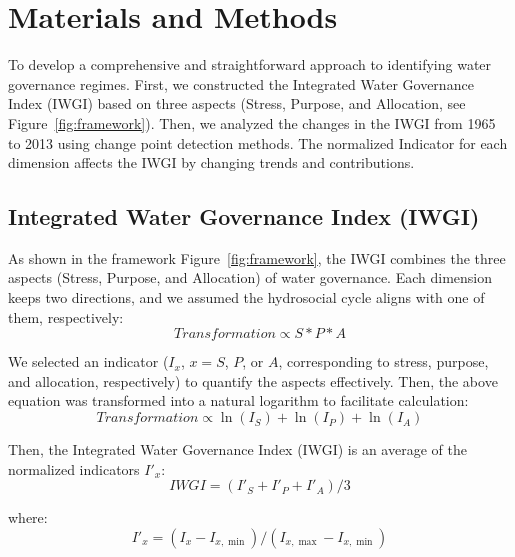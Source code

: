 \documentclass[draft]{../agujournal2019}
\begin{document}
\section{Materials and Methods}\label{sec11}


To develop a comprehensive and straightforward approach to identifying water governance regimes. First, we constructed the Integrated Water Governance Index (IWGI) based on three aspects (Stress, Purpose, and Allocation, see Figure~\ref{fig:framework}). Then, we analyzed the changes in the IWGI from 1965 to 2013 using change point detection methods. The normalized Indicator for each dimension affects the IWGI by changing trends and contributions.

\subsection{Integrated Water Governance Index (IWGI)}

As shown in the framework Figure~\ref{fig:framework}, the IWGI combines the three aspects (Stress, Purpose, and Allocation) of water governance. Each dimension keeps two directions, and we assumed the hydrosocial cycle aligns with one of them, respectively:
	\begin{equation}
		Transformation \propto S*P*A
	\end{equation}

	We selected an indicator ($I_x$, $x=S$, $P$, or $A$, corresponding to stress, purpose, and allocation, respectively) to quantify the aspects effectively. Then, the above equation was transformed into a natural logarithm to facilitate calculation:
	\begin{equation}
		Transformation \propto \ln(I_S) + \ln(I_P) + \ln(I_A)
	\end{equation}

	Then, the Integrated Water Governance Index (IWGI) is an average of the normalized indicators $I'_x$:
	\begin{equation}
		IWGI = (I'_S + I'_P + I'_A) / 3
	\end{equation}

	where:
	\begin{equation}
		I'_x = (I_x - I_{x, \min}) / (I_{x, \max} - I_{x, \min})
	\end{equation}
\end{document}
